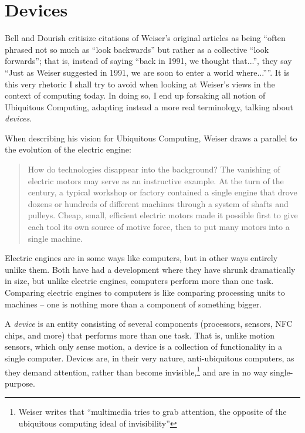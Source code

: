 \section{Devices}
\label{sec:devices}

Bell and Dourish critisize citations of Weiser's original articles as being ``often phrased not so much as ``look backwards''
but rather as a collective ``look forwards''; that is, instead of saying ``back in 1991, we thought that...'', they say ``Just
as Weiser suggested in 1991, we are soon to enter a world where...''''.\cite{bell07} It is this very rhetoric I shall try to avoid when looking
at Weiser's views in the context of computing today. In doing so, I end up forsaking all notion of Ubiquitous Computing, adapting
instead a more real terminology, talking about \emph{devices}.

When describing his vision for Ubiquitous Computing, Weiser draws a parallel to the evolution of the electric engine:

\begin{quote}
    How do technologies disappear into the background? The vanishing of electric motors may serve as an instructive example.
    At the turn of the century, a typical workshop or factory contained a single engine that drove dozens or hundreds of
    different machines through a system of shafts and pulleys. Cheap, small, efficient electric motors made it possible first
    to give each tool its own source of motive force, then to put many motors into a single machine.\cite{weiser91}
\end{quote}

Electric engines are in some ways like computers, but in other ways entirely unlike them. Both have had a development where
they have shrunk dramatically in size, but unlike electric engines, computers perform more than one task. Comparing electric
engines to computers is like comparing processing units to machines -- one is nothing more than a component of something bigger.

A \emph{device} is an entity consisting of several components (processors, sensors, NFC chips, and more) that performs more
than one task. That is, unlike motion sensors, which only sense motion, a device is a collection of functionality in a single
computer. Devices are, in their very nature, anti-ubiquitous computers, as they demand attention, rather than become
invisible,\footnote{Weiser writes that ``multimedia tries to grab attention, the opposite of the ubiquitous computing ideal of
invisibility''\cite{weiser93}} and are in no way single-purpose.

